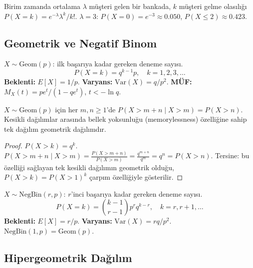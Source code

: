 \begin{ornek}
Birim zamanda ortalama $\lambda$ müşteri gelen bir bankada,
$k$ müşteri gelme olasılığı $P(X=k) = e^{-\lambda}\lambda^k/k!$.
$\lambda = 3$: $P(X = 0) = e^{-3} \approx 0.050$, $P(X \leq 2) \approx 0.423$.
\end{ornek}

\subsection{Geometrik ve Negatif Binom}
\label{subsec:geometrik}

\begin{tanim}
\label{def:geometrik}
$X \sim \mathrm{Geom}(p)$: ilk başarıya kadar gereken deneme sayısı.
\[
  P(X = k) = q^{k-1} p, \quad k = 1, 2, 3, \ldots
\]
\textbf{Beklenti:} $E[X] = 1/p$. \quad \textbf{Varyans:} $\mathrm{Var}(X) = q/p^2$.
\textbf{MÜF:} $M_X(t) = pe^t / (1 - qe^t)$, $t < -\ln q$.
\end{tanim}

\begin{onerme}
\label{prop:bellek_yoksunlugu}
$X \sim \mathrm{Geom}(p)$ için her $m, n \geq 1$'de
$P(X > m+n \mid X > m) = P(X > n)$.
Kesikli dağılımlar arasında bellek yoksunluğu (memorylessness) özelliğine sahip
tek dağılım geometrik dağılımdır.
\end{onerme}

\begin{proof}
$P(X > k) = q^k$.
$P(X > m+n \mid X > m) = \frac{P(X > m+n)}{P(X > m)} = \frac{q^{m+n}}{q^m} = q^n = P(X > n)$.
Tersine: bu özelliği sağlayan tek kesikli dağılımın geometrik olduğu,
$P(X > k) = P(X > 1)^k$ çarpım özelliğiyle gösterilir.
\end{proof}

\begin{tanim}
\label{def:neg_binom}
$X \sim \mathrm{NegBin}(r, p)$: $r$'inci başarıya kadar gereken deneme sayısı.
\[
  P(X = k) = \binom{k-1}{r-1} p^r q^{k-r}, \quad k = r, r+1, \ldots
\]
\textbf{Beklenti:} $E[X] = r/p$. \quad
\textbf{Varyans:} $\mathrm{Var}(X) = rq/p^2$.\\
$\mathrm{NegBin}(1, p) = \mathrm{Geom}(p)$.
\end{tanim}

\subsection{Hipergeometrik Dağılım}
\label{subsec:hiper}

